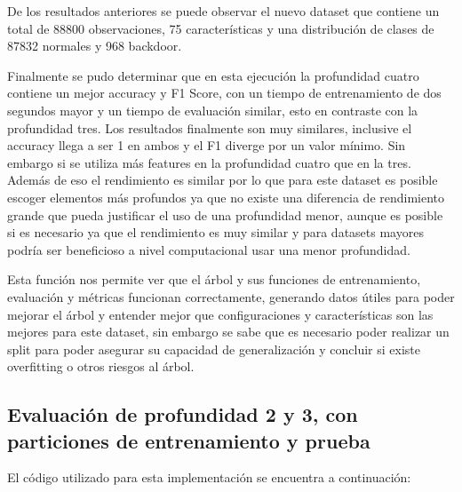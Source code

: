 \documentclass[12pt,a4paper]{article}
\begin{document}
De los resultados anteriores se puede observar el nuevo dataset que contiene un total de 88800 observaciones, 75 características y
una distribución de clases de 87832 normales y 968 backdoor.

Finalmente se pudo determinar que en esta ejecución la profundidad cuatro contiene un mejor accuracy y F1 Score, con un tiempo de entrenamiento
de dos segundos mayor y un tiempo de evaluación similar, esto en contraste con la profundidad tres. Los resultados finalmente son muy similares,
inclusive el accuracy llega a ser 1 en ambos y el F1 diverge por un valor mínimo. Sin embargo si se utiliza más features en la profundidad cuatro que en la tres.
Además de eso el rendimiento es similar por lo que para este dataset es posible escoger elementos más profundos ya que no existe una diferencia de rendimiento
grande que pueda justificar el uso de una profundidad menor, aunque es posible si es necesario ya que el rendimiento es muy similar y para datasets mayores podría ser
beneficioso a nivel computacional usar una menor profundidad.

Esta función nos permite ver que el árbol y sus funciones de entrenamiento, evaluación y métricas funcionan correctamente, generando
datos útiles para poder mejorar el árbol y entender mejor que configuraciones y características son las mejores para este dataset, sin embargo se sabe que
es necesario poder realizar un split para poder asegurar su capacidad de generalización y concluir si existe overfitting o otros riesgos al árbol.

\subsection{Evaluación de profundidad 2 y 3, con particiones de entrenamiento y prueba}\label{subsec:evaluacion-de-profundidad-2-y-3-con-particiones-de-entrenamiento-y-prueba}

El código utilizado para esta implementación se encuentra a continuación:
\end{document}
